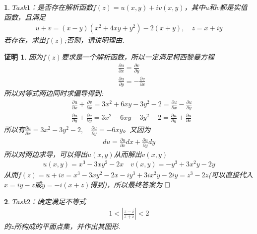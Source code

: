 \documentclass{ctexart}
\newcommand{\。}{．} %
\newenvironment{lanse}{
    \begin{tcolorbox}[breakable,enhanced, colback=qlan, boxrule=0pt, frame hidden,
        borderline west={0.7mm}{0.1mm}{slan}]
    }
    {\end{tcolorbox}}
\newenvironment{huangse}{
    \begin{tcolorbox}[breakable,enhanced, colback=qhuang, boxrule=0pt, frame hidden,
        borderline west={0.7mm}{0.1mm}{shuang}]
    }
    {\end{tcolorbox}}
\newenvironment{zise}{
    \begin{tcolorbox}[breakable,enhanced, colback=qzi, boxrule=0pt, frame hidden,
        borderline west={0.7mm}{0.1mm}{szi}]
    }
    {\end{tcolorbox}}
\theoremstyle{t} %
\newtheorem{dlhj}{\color{shuang} 定理}[subsection]
\newtheorem{lthj}{\color{szi} }
\newtheorem*{zmhj}{\color{slan} 证明}
\newtheorem*{smhj}{\color{slan} }
\newenvironment{zm}{\begin{lanse}\begin{zmhj}}{$\hfill \square$\end{zmhj}\end{lanse}}
\newenvironment{dl}{\begin{huangse}\begin{dlhj}}{\end{dlhj}\end{huangse}}
\newenvironment{lt}{\begin{zise}\begin{lthj}}{\end{lthj}\end{zise}}
\newenvironment{sm}{\begin{zise}\begin{smhj}}{\end{smhj}\end{zise}}
\begin{document}

\begin{sm}
    $Task1$：是否存在解析函数$f(z)=u(x,y)+iv(x,y)$，其中$u$和$v$都是实值函数，且满足
    \begin{align*}
        u+v=(x-y)(x^2+4xy+y^2)-2(x+y),\quad z=x+iy
    \end{align*}
    若存在，求出$f(z)$;否则，请说明理由.
\end{sm}
\begin{zm}
    因为$f(z)$要求是一个解析函数，所以一定满足柯西黎曼方程
    \begin{align*}
        &\frac{\partial u}{\partial x}=\frac{\partial v}{\partial y}\\
        &\frac{\partial u}{\partial y}=-\frac{\partial v}{\partial x}
    \end{align*}
    所以对等式两边同时求偏导得到:
    \begin{align*}
        &\frac{\partial u}{\partial x}+\frac{\partial v}{\partial x}=3x^2+6xy-3y^2-2=\frac{\partial u}{\partial x}-\frac{\partial u}{\partial y}\\
        &\frac{\partial u}{\partial y}+\frac{\partial v}{\partial y}=3x^2-6xy-3y^2-2=\frac{\partial u}{\partial y}+\frac{\partial u}{\partial x}
    \end{align*}
    所以有$\frac{\partial u}{\partial x}=3x^2-3y^2-2,\quad \frac{\partial u}{\partial y}=-6xy$。又因为
    \begin{align*}
        du=\frac{\partial u}{\partial x}dx+\frac{\partial u}{\partial y}dy
    \end{align*}
    所以对两边求导，可以得出$u(x,y)$从而解出$v(x,y)$
    \begin{align*}
        u(x,y)=x^3-3xy^2-2x\quad v(x,y)=-y^3+3x^2y-2y
    \end{align*}
    从而$f(z)=u+iv=x^3-3xy^2-2x-iy^3+3ix^2y-2iy=z^3-2z$(可以直接代入$x=iy-z$或$y=-i(x+z)$得到)，所以最终答案为
\end{zm}
\begin{sm}
    $Task2$：确定满足不等式\begin{align*}
        1<\left|\frac{z-i}{z+i}\right|<2
    \end{align*}的$z$所构成的平面点集，并作出其图形.
\end{sm}
\end{document}
